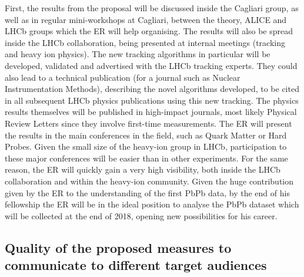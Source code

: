 \documentclass[a4paper,11pt]{article}
\newcommand{\ER}{ER\xspace}
\begin{document}
First, the results from the proposal will be discussed inside the
Cagliari group, as well as in regular mini-workshops at Cagliari, 
between the theory, ALICE and LHCb groups which the \ER will
help organising. The results will also be
spread inside the LHCb collaboration, being presented at internal
meetings (tracking and heavy ion physics). The new tracking algorithms
in particular will be developed, validated and advertised with the
LHCb tracking experts. They could also lead to a technical publication
(for a journal such as Nuclear Instrumentation Methods), describing
the novel algorithms developed, to be cited in all subsequent LHCb
physics publications using this new tracking. The physics results
themselves will be published in high-impact journals, most likely
Physical Review Letters since they involve first-time
measurements. The \ER will present the results in the main conferences in the
field, such as Quark Matter or Hard Probes. Given
the small size of the heavy-ion group in LHCb, participation to these
major conferences will be easier than in other experiments. For the
same reason, the \ER will quickly gain a very high visibility, both
inside the LHCb collaboration and within the heavy-ion community.
Given the huge contribution given by the \ER to the understanding of the 
first PbPb data, by the end of his fellowship the \ER will be in the 
ideal position to analyse the PbPb dataset which will be collected
at the end of 2018, opening new possibilities for his 
career. 



%           

\subsection{Quality of the proposed measures to communicate to different target audiences }
% 
% 
\end{document}
